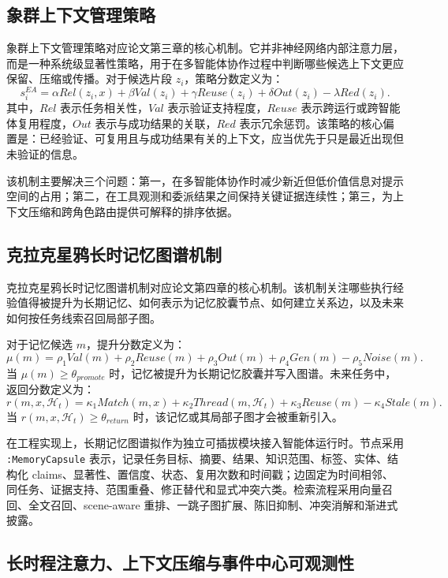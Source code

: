 \documentclass[UTF8,a4paper,zihao=-4,fontset=windows]{ctexart}
\begin{document}
\subsection{象群上下文管理策略}

象群上下文管理策略对应论文第三章的核心机制。它并非神经网络内部注意力层，而是一种系统级显著性策略，用于在多智能体协作过程中判断哪些候选上下文更应保留、压缩或传播。对于候选片段 $z_i$，策略分数定义为：
\[
s_i^{EA}=\alpha Rel(z_i,x)+\beta Val(z_i)+\gamma Reuse(z_i)+\delta Out(z_i)-\lambda Red(z_i).
\]
其中，$Rel$ 表示任务相关性，$Val$ 表示验证支持程度，$Reuse$ 表示跨运行或跨智能体复用程度，$Out$ 表示与成功结果的关联，$Red$ 表示冗余惩罚。该策略的核心偏置是：已经验证、可复用且与成功结果有关的上下文，应当优先于只是最近出现但未验证的信息。

该机制主要解决三个问题：第一，在多智能体协作时减少新近但低价值信息对提示空间的占用；第二，在工具观测和委派结果之间保持关键证据连续性；第三，为上下文压缩和跨角色路由提供可解释的排序依据。

\subsection{克拉克星鸦长时记忆图谱机制}

克拉克星鸦长时记忆图谱机制对应论文第四章的核心机制。该机制关注哪些执行经验值得被提升为长期记忆、如何表示为记忆胶囊节点、如何建立关系边，以及未来如何按任务线索召回局部子图。

对于记忆候选 $m$，提升分数定义为：
\[
\mu(m)=\rho_1 Val(m)+\rho_2 Reuse(m)+\rho_3 Out(m)+\rho_4 Gen(m)-\rho_5 Noise(m).
\]
当 $\mu(m)\geq \theta_{promote}$ 时，记忆被提升为长期记忆胶囊并写入图谱。未来任务中，返回分数定义为：
\[
r(m,x,\mathcal{H}_t)=\kappa_1 Match(m,x)+\kappa_2 Thread(m,\mathcal{H}_t)+\kappa_3 Reuse(m)-\kappa_4 Stale(m).
\]
当 $r(m,x,\mathcal{H}_t)\geq \theta_{return}$ 时，该记忆或其局部子图才会被重新引入。

在工程实现上，长期记忆图谱拟作为独立可插拔模块接入智能体运行时。节点采用 \texttt{:MemoryCapsule} 表示，记录任务目标、摘要、结果、知识范围、标签、实体、结构化 claims、显著性、置信度、状态、复用次数和时间戳；边固定为时间相邻、同任务、证据支持、范围重叠、修正替代和显式冲突六类。检索流程采用向量召回、全文召回、scene-aware 重排、一跳子图扩展、陈旧抑制、冲突消解和渐进式披露。

\subsection{长时程注意力、上下文压缩与事件中心可观测性}
\end{document}
